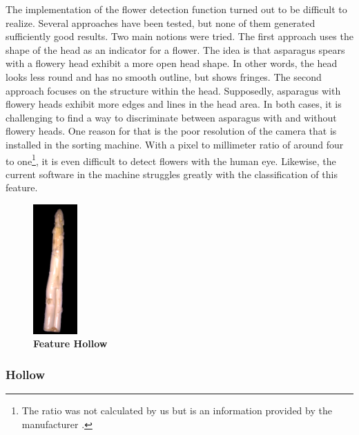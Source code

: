 \bigskip
The implementation of the flower detection function turned out to be difficult to realize. Several approaches have been tested, but none of them generated sufficiently good results. Two main notions were tried. The first approach uses the shape of the head as an indicator for a flower. The idea is that asparagus spears with a flowery head exhibit a more open head shape. In other words, the head looks less round and has no smooth outline, but shows fringes. The second approach focuses on the structure within the head. Supposedly, asparagus with flowery heads exhibit more edges and lines in the head area. In both cases, it is challenging to find a way to discriminate between asparagus with and without flowery heads. One reason for that is the poor resolution of the camera that is installed in the sorting machine. With a pixel to millimeter ratio of around four to one\footnote{The ratio was not calculated by us but is an information provided by the manufacturer \citep{autoselectanleitung}.}, it is even difficult to detect flowers with the human eye. Likewise, the current software in the machine struggles greatly with the classification of this feature.

\begin{figure}
  \begin{center}
    \includegraphics[width=0.15\textwidth]{Figures/chapter03/example_img_hollow.png}
  \end{center}
  \vspace{-15pt}
  \caption[Example Image Feature Hollow]{ \textbf{Feature Hollow}}
  \label{fig:ExampleHollow}
  \vspace{15pt}
\end{figure}


\subsubsection{Hollow}
\label{subsec:Hollow}

